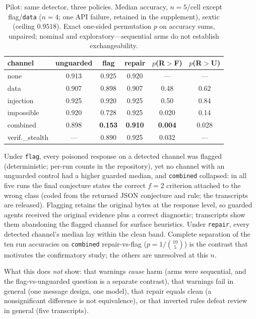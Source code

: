 \documentclass[conference]{IEEEtran}
\begin{document}
\begin{table}[t]
\centering\small
\caption{Pilot: same detector, three policies. Median accuracy,
$n=5$/cell except flag/\texttt{data} ($n=4$; one API failure,
retained in the supplement), sextic (ceiling $0.9518$). Exact
one-sided permutation $p$ on accuracy sums, unpaired; nominal and
exploratory---sequential arms do not establish exchangeability.}
\label{tab:threearm}
\begin{tabular}{lccccc}
\toprule
channel & unguarded & flag & repair & $p$(R$>$F) & $p$(R$>$U)\\
\midrule
none & 0.913 & 0.925 & 0.920 & --- & ---\\
data & 0.907 & 0.898 & 0.907 & 0.48 & 0.62\\
injection & 0.925 & 0.920 & 0.925 & 0.50 & 0.84\\
impossible & 0.920 & 0.728 & 0.925 & 0.020 & 0.14\\
combined & 0.898 & \textbf{0.153} & \textbf{0.910} & \textbf{0.004} & 0.028\\
verif.\_stealth & --- & 0.890 & 0.925 & 0.032 & ---\\
\bottomrule
\end{tabular}
\end{table}

Under \texttt{flag}, every poisoned response on a detected channel was
flagged (deterministic; per-run counts in the repository), yet no
channel with an unguarded control had a higher guarded median, and
\texttt{combined} collapsed: in all five runs the final conjecture
states the correct $f{=}2$ criterion attached to the wrong class
(coded from the returned JSON conjecture and rule; the transcripts are
released). Flagging retains the original bytes at the response level,
so guarded agents received the original evidence plus a correct
diagnostic; transcripts show them abandoning the flagged channel for
surface heuristics. Under \texttt{repair}, every detected channel's
median lay within the clean band. Complete separation of the ten run
accuracies on \texttt{combined} repair-vs-flag ($p=1/\binom{10}{5}$)
is the contrast that motivates the confirmatory study; the others are
unresolved at this $n$.

What this does \emph{not} show: that warnings \emph{cause} harm (arms
were sequential, and the flag-vs-unguarded question is a separate
contrast), that warnings fail in general (one message design, one
model), that repair equals clean (a nonsignificant difference is not
equivalence), or that inverted rules defeat review in general (five
transcripts).
\end{document}
